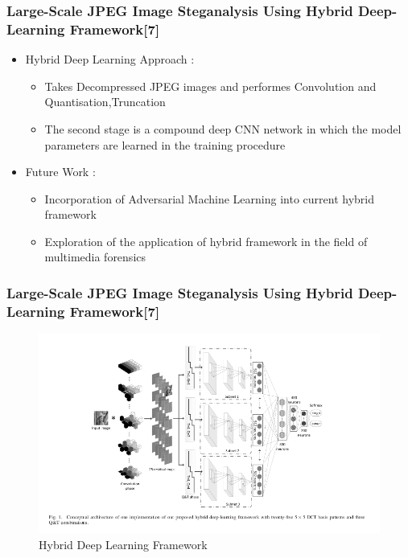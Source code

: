 \documentclass{beamer} %
\theoremstyle{definition} %
\begin{document}
\begin{frame}
\frametitle{Large-Scale JPEG Image Steganalysis Using Hybrid Deep-Learning Framework[7]  }
\begin{itemize}
\item Hybrid Deep Learning Approach :
\begin{itemize}
	\item Takes Decompressed JPEG images and performes Convolution and Quantisation,Truncation
	\item The second stage is a compound deep CNN network in which the model parameters are learned in the training procedure 
\end{itemize}
\item Future Work : 
\begin{itemize}
	\item Incorporation of Adversarial Machine Learning into current hybrid framework  
	\item Exploration of the application of hybrid framework in
	the field of multimedia forensics 
\end{itemize}
\end{itemize}
\end{frame}

\begin{frame}
\frametitle{Large-Scale JPEG Image Steganalysis Using Hybrid Deep-Learning Framework[7]  }

\begin{figure}
	\includegraphics[scale=0.3]{jpegStegAnalysis.png}
	\caption{Hybrid Deep Learning Framework}
\end{figure}
\end{frame}
\end{document}
